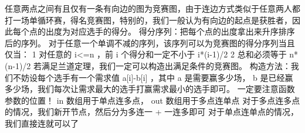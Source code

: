 {}任意两点之间有且仅有一条有向边的图为竞赛图，由于连边方式类似于任意两人都打一场单循环赛，得名竞赛图，特别的，我们一般认为有向边的起点是获胜者，因此每个点的出度为对应选手的得分。\markdownRendererParagraphSeparator
{}得分序列：把每个点的出度拿出来升序排序后的序列。\markdownRendererParagraphSeparator
{}\markdownRendererSectionBegin
\markdownRendererSectionBegin
{}\markdownRendererInterblockSeparator
{}对于任意一个单调不减的序列，该序列可以为竞赛图的得分序列当且仅当：\markdownRendererParagraphSeparator
{}\markdownRendererDollarSign{} 1 \markdownRendererDollarSign{}对任意的\markdownRendererDollarSign{} i<=n \markdownRendererDollarSign{}，前\markdownRendererDollarSign{} i \markdownRendererDollarSign{}个得分和一定不小于\markdownRendererDollarSign{} i*(i-1)/2 \markdownRendererDollarSign{}\markdownRendererParagraphSeparator
{}\markdownRendererDollarSign{} 2 \markdownRendererDollarSign{}总和必须等于\markdownRendererDollarSign{} n*(n-1)/2 \markdownRendererDollarSign{}\markdownRendererParagraphSeparator
{}若满足兰道定理，我们一定可以构造出满足条件的竞赛图。\markdownRendererParagraphSeparator
{}构造方法：我们不妨设每个选手有一个需求值\markdownRendererDollarSign{} a[i]-b[i] \markdownRendererDollarSign{}，其中\markdownRendererDollarSign{} a \markdownRendererDollarSign{}是需要赢多少场，\markdownRendererDollarSign{} b \markdownRendererDollarSign{}是已经赢多少场，我们每次让需求最大的选手打赢需求最小的选手即可。\markdownRendererInterblockSeparator
{}
\markdownRendererSectionEnd 
\markdownRendererSectionEnd 
\markdownRendererSectionEnd \markdownRendererSectionBegin
{}\markdownRendererInterblockSeparator
{}\markdownRendererSectionBegin
{}\markdownRendererInterblockSeparator
{}一定要注意函数参数的位置！\markdownRendererParagraphSeparator
{}\markdownRendererDollarSign{} in \markdownRendererDollarSign{}数组用于单点连多点，\markdownRendererDollarSign{} out\markdownRendererSoftLineBreak
{}\markdownRendererDollarSign{}数组用于多点连单点\markdownRendererParagraphSeparator
{}对于多点连多点的情况，我们新开节点，然后分为多连一\markdownRendererDollarSign{} + \markdownRendererDollarSign{}一连多即可\markdownRendererParagraphSeparator
{}对于单点连单点的情况，我们直接连就可以了\markdownRendererInterblockSeparator
{}\markdownRendererInterblockSeparator
{}
\markdownRendererSectionEnd \markdownRendererSectionBegin
{}\markdownRendererInterblockSeparator
